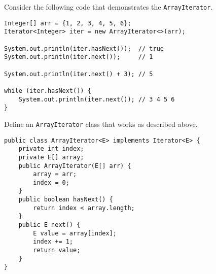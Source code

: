 \question Consider the following code that demonstrates the \texttt{ArrayIterator}.

\begin{lstlisting}
Integer[] arr = {1, 2, 3, 4, 5, 6};
Iterator<Integer> iter = new ArrayIterator<>(arr);

System.out.println(iter.hasNext());  // true
System.out.println(iter.next());     // 1

System.out.println(iter.next() + 3); // 5

while (iter.hasNext()) {
    System.out.println(iter.next()); // 3 4 5 6
}
\end{lstlisting}

Define an \texttt{ArrayIterator} class that works as described above.

\begin{solution}[5in]
\begin{lstlisting}
public class ArrayIterator<E> implements Iterator<E> {
    private int index;
    private E[] array;
    public ArrayIterator(E[] arr) {
        array = arr;
        index = 0;
    }
    public boolean hasNext() {
        return index < array.length;
    }
    public E next() {
        E value = array[index];
        index += 1;
        return value;
    }
}
\end{lstlisting}
\end{solution}